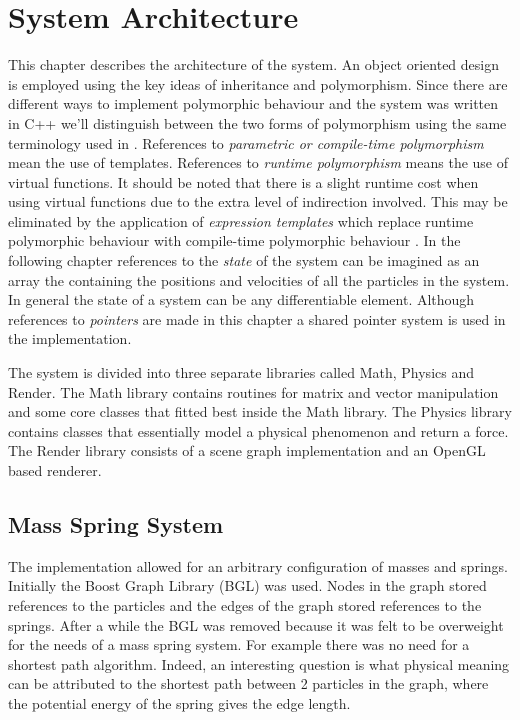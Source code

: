 \chapter{System Architecture}
This chapter describes the architecture of the system. An object oriented design
is employed using the key ideas of inheritance and polymorphism. Since there are
different ways to implement polymorphic behaviour and the system was written in
C++ we'll distinguish between the two forms of polymorphism using the same
terminology used in \cite{Stroustrup}. References to \textit{parametric or
compile-time polymorphism} mean the use of templates. References to
\textit{runtime polymorphism} means the use of virtual functions. It should be
noted that there is a slight runtime cost when using virtual functions due to
the extra level of indirection involved. This may be eliminated by the
application of \textit{expression templates} which replace runtime polymorphic
behaviour with compile-time polymorphic behaviour \cite{Veldhuizen95b, LangerKreft}. In the
following chapter references to the \textit{state} of the system can be imagined
as an array the containing the positions and velocities of all the particles in
the system. In general the state of a system can be any differentiable element.
Although references to \textit{pointers} are made in this chapter a shared
pointer system is used in the implementation. 

The system is divided into three separate libraries called Math, Physics and
Render. The Math library contains routines for matrix and vector manipulation
and some core classes that fitted best inside the Math library. The Physics
library contains classes that essentially model a physical phenomenon and return
a force. The Render library consists of a scene graph implementation and an
OpenGL based renderer.

\section{Mass Spring System}
The implementation allowed for an arbitrary configuration of masses and springs.
Initially the Boost Graph Library (BGL) \cite{BGL} was used. Nodes in the graph
stored references to the particles and the edges of the graph stored references
to the springs. After a while the BGL was removed because it was felt to be
overweight for the needs of a mass spring system. For example there was no need
for a shortest path algorithm. Indeed, an interesting question is what physical
meaning can be attributed to the shortest path between 2 particles in the graph,
where the potential energy of the spring gives the edge length.


